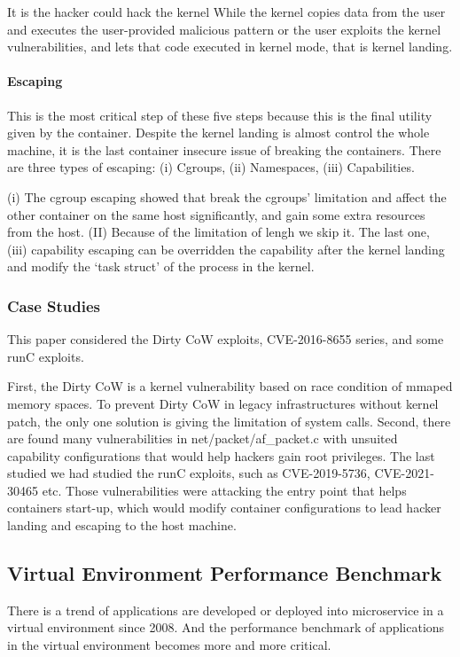 It is the hacker could hack the kernel
While the kernel copies data from the user and executes the user-provided malicious pattern
or the user exploits the kernel vulnerabilities, and lets that code executed in kernel mode, that is kernel landing.

\paragraph{Escaping}

This is the most critical step of these five steps because this is the final utility given by the
container. Despite the kernel landing is almost control the whole machine, it is the last container
insecure issue of breaking the containers. There are three types of escaping: (\Rn{1}) Cgroups,
(\Rn{2}) Namespaces, (\Rn{3}) Capabilities.

(\Rn{1}) The cgroup escaping showed that \textcite{10.1145/3319535.3354227} break the
cgroups' limitation and affect the other container on the same host significantly, and gain
some extra resources from the host. (\RN{2}) Because of the limitation of lengh we skip it.
The last one, (\Rn{3}) capability escaping can be overridden the capability after the kernel landing
and modify the `task struct' of the process in the kernel.

\subsubsection{Case Studies}
This paper considered the Dirty CoW \textcite{8019988, 6394426} exploits, CVE-2016-8655 series, 
and some runC exploits.

First, the Dirty CoW is a kernel vulnerability based on race condition of mmaped memory spaces.
To prevent Dirty CoW in legacy infrastructures without kernel patch, the only one solution is
giving the limitation of system calls. Second, there are found many vulnerabilities in net/packet/af\_packet.c
with unsuited capability configurations that would help hackers gain root privileges. The last
studied we had studied the runC exploits, such as CVE-2019-5736, CVE-2021-30465 etc. Those vulnerabilities
were attacking the entry point that helps containers start-up, which would modify container configurations 
to lead hacker landing and escaping to the host machine.

\subsection{Virtual Environment Performance Benchmark}
There is a trend of applications are developed or deployed into microservice in a virtual
environment since 2008. And the performance benchmark of applications in the virtual
environment becomes more and more critical.


